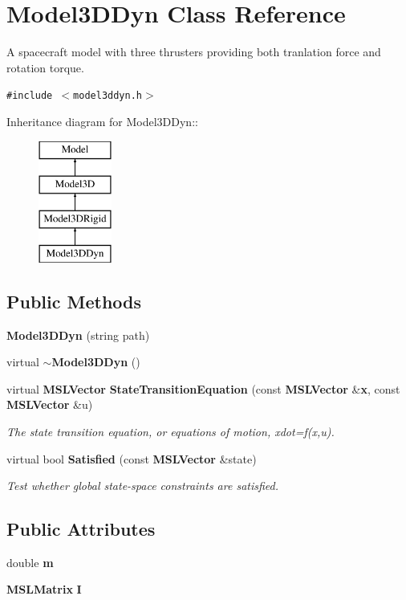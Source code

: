\section{Model3DDyn  Class Reference}
\label{classModel3DDyn}
A spacecraft model with three thrusters providing both tranlation force and rotation torque. 


{\tt \#include $<$model3ddyn.h$>$}

Inheritance diagram for Model3DDyn::\begin{figure}[H]
\begin{center}
\leavevmode
\includegraphics[height=4cm]{classModel3DDyn}
\end{center}
\end{figure}
\subsection*{Public Methods}
\begin{CompactItemize}
\item 
{\bf Model3DDyn} (string path)
\item 
virtual {\bf $\sim$Model3DDyn} ()
\item 
virtual {\bf MSLVector} {\bf State\-Transition\-Equation} (const {\bf MSLVector} \&{\bf x}, const {\bf MSLVector} \&u)
\begin{CompactList}\small\item\em The state transition equation, or equations of motion, xdot=f(x,u).\item\end{CompactList}\item 
virtual bool {\bf Satisfied} (const {\bf MSLVector} \&state)
\begin{CompactList}\small\item\em Test whether global state-space constraints are satisfied.\item\end{CompactList}\end{CompactItemize}
\subsection*{Public Attributes}
\begin{CompactItemize}
\item 
double {\bf m}
\item 
{\bf MSLMatrix} {\bf I}
\end{CompactItemize}


